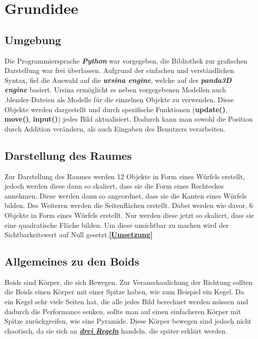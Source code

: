 \documentclass[a4paper, hidelinks, 12pt]{article}
\begin{document}
\section{Grundidee}
\subsection{Umgebung}
Die Programmiersprache \emph{\textbf{Python}} war vorgegeben, die Bibliothek zur grafischen Darstellung war frei überlassen. Aufgrund der einfachen und verständlichen Syntax, fiel die Auswahl auf die \emph{\textbf{ursina engine}}\cite{2022k}, welche auf der \emph{\textbf{panda3D engine}} basiert. Ursina ermöglicht es neben vorgegebenen Modellen auch .blender-Dateien als Modelle für die einzelnen Objekte zu verwenden. Diese Objekte werden dargestellt und durch spezifische Funktionen (\textbf{update()}, \textbf{move()}, \textbf{input()}) jedes Bild aktualisiert\cite{2022}. Dadurch kann man sowohl die Position durch Addition verändern, als auch Eingaben des Benutzers verarbeiten. 
	
\subsection{Darstellung des Raumes}
Zur Darstellung des Raumes werden 12 Objekte in Form eines Würfels erstellt, jedoch werden diese dann so skaliert, dass sie die Form eines Rechteckes annehmen. Diese werden dann so angeordnet, dass sie die Kanten eines Würfels bilden. 
Des Weiteren werden die Seitenflächen erstellt. Dabei werden wie davor, 6 Objekte in Form eines Würfels erstellt. Nur werden diese jetzt so skaliert, dass sie eine quadratische Fläche bilden. Um diese unsichtbar zu machen wird der Sichtbarkeitswert auf Null gesetzt.\cite{2022l}\hyperref[UmsetzungWireframe]{\textbf{[Umsetzung]}}
		
\subsection{Allgemeines zu den Boids}
Boids sind Körper, die sich Bewegen. Zur Veranschaulichung der Richtung sollten die Boids einen Körper mit einer Spitze haben, wie zum Beispiel ein Kegel. Da ein Kegel sehr viele Seiten hat, die alle jedes Bild berechnet werden müssen und dadurch die Performance senken, sollte man auf einen einfacheren Körper mit Spitze zurückgreifen, wie eine Pyramide. Diese Körper bewegen sind jedoch nicht chaotisch, da sie sich an \hyperref[IdeeRegel]{\textbf{\emph{drei Regeln}}} handeln, die später erklärt werden.\linebreak
\newpage
\end{document}
